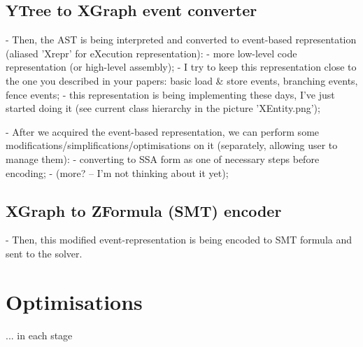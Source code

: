 \subsection{YTree to XGraph event converter}
\label{section:impl:comp:xgraph}

- Then, the AST is being interpreted and converted to event-based representation (aliased 'Xrepr' for eXecution representation):
        - more low-level code representation (or high-level assembly);
        - I try to keep this representation close to the one you described in your papers: basic load \& store events, branching events, fence events;
        - this representation is being implementing these days, I've just started doing it (see current class hierarchy in the picture 'XEntity.png');
        
- After we acquired the event-based representation, we can perform some modifications/simplifications/optimisations on it (separately, allowing user to manage them):
        - converting to SSA form as one of necessary steps before encoding;
        - (more? -- I'm not thinking about it yet);


\subsection{XGraph to ZFormula (SMT) encoder}
\label{section:impl:comp:zformula}

- Then, this modified event-representation is being encoded to SMT formula and sent to the solver.



\section{Optimisations}

... in each stage